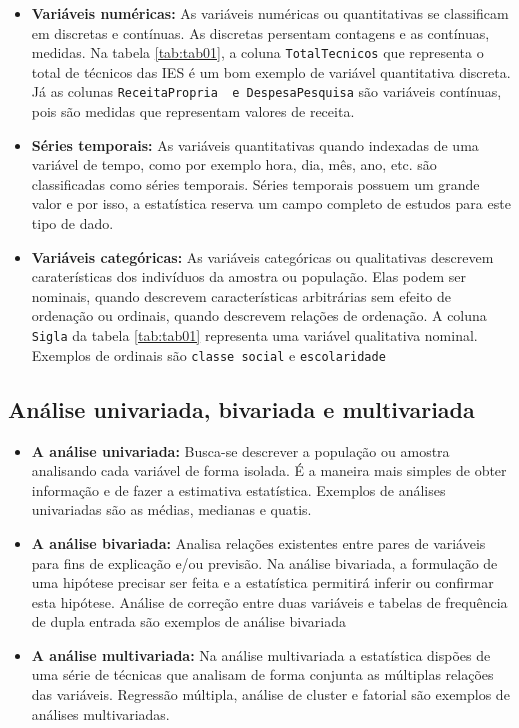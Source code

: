 \documentclass[12pt,]{style/krantz}
\theoremstyle{definition}
\theoremstyle{definition}
\theoremstyle{definition}
\theoremstyle{remark}
\begin{document}
\begin{itemize}
\item
  \textbf{Variáveis numéricas:} As variáveis numéricas ou quantitativas
  se classificam em discretas e contínuas. As discretas persentam
  contagens e as contínuas, medidas. Na tabela \ref{tab:tab01}, a coluna
  \texttt{TotalTecnicos} que representa o total de técnicos das IES é um
  bom exemplo de variável quantitativa discreta. Já as colunas
  \texttt{ReceitaPropria\ \ e\ DespesaPesquisa} são variáveis contínuas,
  pois são medidas que representam valores de receita.
\item
  \textbf{Séries temporais:} As variáveis quantitativas quando indexadas
  de uma variável de tempo, como por exemplo hora, dia, mês, ano, etc.
  são classificadas como séries temporais. Séries temporais possuem um
  grande valor e por isso, a estatística reserva um campo completo de
  estudos para este tipo de dado.
\item
  \textbf{Variáveis categóricas:} As variáveis categóricas ou
  qualitativas descrevem caraterísticas dos indivíduos da amostra ou
  população. Elas podem ser nominais, quando descrevem características
  arbitrárias sem efeito de ordenação ou ordinais, quando descrevem
  relações de ordenação. A coluna \texttt{Sigla} da tabela
  \ref{tab:tab01} representa uma variável qualitativa nominal. Exemplos
  de ordinais são \texttt{classe\ social} e \texttt{escolaridade}
\end{itemize}

\subsection{Análise univariada, bivariada e
multivariada}\label{analise-univariada-bivariada-e-multivariada}

\begin{itemize}
\item
  \textbf{A análise univariada:} Busca-se descrever a população ou
  amostra analisando cada variável de forma isolada. É a maneira mais
  simples de obter informação e de fazer a estimativa estatística.
  Exemplos de análises univariadas são as médias, medianas e quatis.
\item
  \textbf{A análise bivariada:} Analisa relações existentes entre pares
  de variáveis para fins de explicação e/ou previsão. Na análise
  bivariada, a formulação de uma hipótese precisar ser feita e a
  estatística permitirá inferir ou confirmar esta hipótese. Análise de
  correção entre duas variáveis e tabelas de frequência de dupla entrada
  são exemplos de análise bivariada
\item
  \textbf{A análise multivariada:} Na análise multivariada a estatística
  dispões de uma série de técnicas que analisam de forma conjunta as
  múltiplas relações das variáveis. Regressão múltipla, análise de
  cluster e fatorial são exemplos de análises multivariadas.
\end{itemize}
\end{document}
